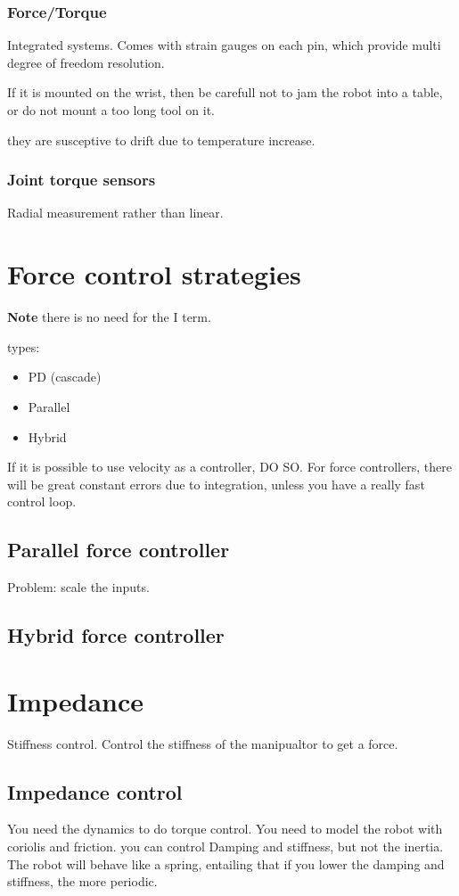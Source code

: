 \documentclass[a4paper]{article}
\begin{document}
\subsubsection{Force/Torque}
Integrated systems. Comes with strain gauges on each pin, which provide multi degree of freedom resolution.

If it is mounted on the wrist, then be carefull not to jam the robot into a table, or do not mount a too long tool on it. 

they are susceptive to drift due to temperature increase. 

\subsubsection{Joint torque sensors}
Radial measurement rather than linear. 


\section{Force control strategies}
\textbf{Note} there is no need for the I term.

types:
\begin{itemize}
	\item PD (cascade)
	\item Parallel
	\item Hybrid
\end{itemize}

If it is possible to use velocity as a controller, DO SO. For force controllers, there will be great constant errors due to integration, unless you have a really fast control loop.



\subsection{Parallel force controller}
Problem: scale the inputs.

\subsection{Hybrid force controller}


\section{Impedance}
Stiffness control. Control the stiffness of the manipualtor to get a force.

\subsection{Impedance control}
You need the dynamics to do torque control. 
You need to model the robot with coriolis and friction. 
you can control Damping and stiffness, but not the inertia. The robot will behave like a spring, entailing that if you lower the damping and stiffness, the more periodic. 
\end{document}
